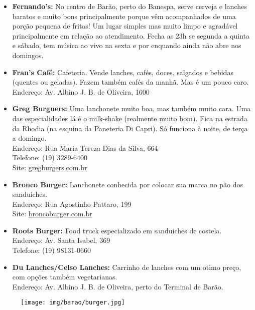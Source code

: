 \begin{itemize}
    \item   \textbf{Fernando's:} No centro de Barão, perto do Banespa, serve
        cerveja e lanches baratos e muito bons principalmente porque vêm
        acompanhados de uma porção pequena de fritas! Um lugar simples mas muito
        limpo e agradável principalmente em relação ao atendimento. Fecha as 23h
        se segunda a quinta e sábado, tem música ao vivo na sexta e por enquando
        ainda não abre nos domingos.

    \item   \textbf{Fran's Café:} Cafeteria. Vende lanches, cafés, doces,
        salgados e bebidas (quentes ou geladas). Fazem também cafés da manhã.
        Mas é um pouco caro.
        \\Endereço: Av. Albino J. B. de Oliveira, 1600

    \item   \textbf{Greg Burguers:} Uma lanchonete muito boa, mas também muito
        cara.  Uma das especialidades lá é o milk-shake (realmente muito bom).
        Fica na estrada da Rhodia (na esquina da Paneteria Di Capri). Só
        funciona à noite, de terça a domingo.
        \\Endereço: Rua Maria Tereza Dias da Silva, 664
        \\Telefone: (19) 3289-6400
        \\Site: \url{gregburgers.com.br}

    \item   \textbf{Bronco Burger:} Lanchonete conhecida por colocar sua marca
        no pão dos sanduíches.
        \\Endereço: Rua Agostinho Pattaro, 199
        \\Site: \url{broncoburger.com.br}

    \item   \textbf{Roots Burger:} Food truck especializado em sanduíches de
        costela.
        \\Endereço: Av. Santa Isabel, 369
        \\Telefone: (19) 98131-0660

    \item   \textbf{Du Lanches/Celso Lanches:} Carrinho de lanches com um otimo
        preço, com opções também vegetarianas.
        \\Endereço: Av. Albino J. B. de Oliveira, perto do Terminal de Barão.

\end{itemize}

\begin{figure}[h!]
    \centering
    \texttt{[image: img/barao/burger.jpg]}
\end{figure}

